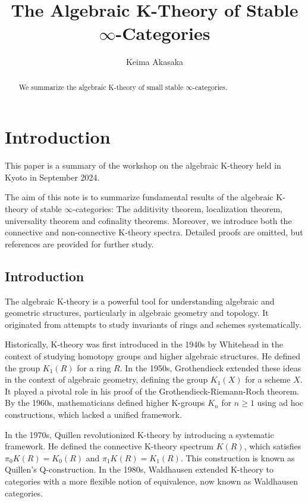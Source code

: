 \documentclass[a4paper,dvipdfmx,11pt,reqno]{amsart}
\title{The Algebraic K-Theory of Stable \texorpdfstring{$\infty$}{infty}-Categories}
\author{Keima Akasaka}
\theoremstyle{definition}
\begin{document}
\maketitle 

\begin{abstract}
  We summarize the algebraic K-theory of small stable $\infty$-categories.
\end{abstract} 

\setcounter{tocdepth}{1}
\tableofcontents   


\section{Introduction}

This paper is a summary of the workshop on the algebraic K-theory held in Kyoto in September 2024.

The aim of this note is to summarize fundamental results of the algebraic K-theory of stable $\infty$-categories:
The additivity theorem, localization theorem, universality theorem and cofinality theorems.
Moreover, we introduce both the connective and non-connective K-theory spectra.
Detailed proofs are omitted, but references are provided for further study.

\subsection{Introduction}

The algebraic K-theory is a powerful tool for understanding algebraic and geometric structures, particularly in algebraic geometry and topology. 
It originated from attempts to study invariants of rings and schemes systematically.

Historically, K-theory was first introduced in the 1940s by Whitehead in the context of studying homotopy groups and higher algebraic structures. 
He defined the group $K_1(R)$ for a ring $R$.
In the 1950s, Grothendieck extended these ideas in the context of algebraic geometry, defining the group $K_1(X)$ for a scheme $X$.
It played a pivotal role in his proof of the Grothendieck-Riemann-Roch theorem.
By the 1960s, mathematicians defined higher K-groups $K_n$ for $n \geq 1$ using ad hoc constructions, which lacked a unified framework.

In the 1970s, Quillen revolutionized K-theory by introducing a systematic framework. 
He defined the connective K-theory spectrum $K(R)$, which satisfies $\pi_0K(R)= K_0(R)$ and $\pi_1K(R) = K_1(R)$.
This construction is known as Quillen's Q-construction.
In the 1980s, Waldhausen extended K-theory to categories with a more flexible notion of equivalence, now known as Waldhausen categories. 
\end{document}
